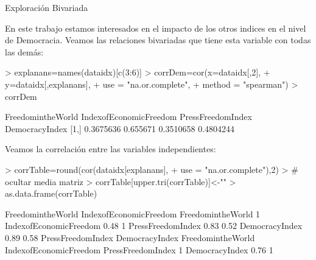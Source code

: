 \documentclass{article}
\begin{document}
Exploración Bivariada

En este trabajo estamos interesados en el impacto de los otros indices en el nivel de Democracia. Veamos las relaciones bivariadas que tiene esta variable con todas las demás:
\begin{Schunk}
\begin{Sinput}
> explanans=names(dataidx)[c(3:6)]
> corrDem=cor(x=dataidx[,2],
+             y=dataidx[,explanans],
+             use = "na.or.complete",
+             method = "spearman")
> corrDem
\end{Sinput}
\begin{Soutput}
     FreedomintheWorld IndexofEconomicFreedom PressFreedomIndex DemocracyIndex
[1,]         0.3675636               0.655671         0.3510658      0.4804244
\end{Soutput}
\end{Schunk}




Veamos la correlación entre las variables independientes:

\begin{Schunk}
\begin{Sinput}
> corrTable=round(cor(dataidx[explanans],
+                use = "na.or.complete"),2)
> # ocultar media matriz
> corrTable[upper.tri(corrTable)]<-""
> as.data.frame(corrTable)
\end{Sinput}
\begin{Soutput}
                       FreedomintheWorld IndexofEconomicFreedom
FreedomintheWorld                      1                       
IndexofEconomicFreedom              0.48                      1
PressFreedomIndex                   0.83                   0.52
DemocracyIndex                      0.89                   0.58
                       PressFreedomIndex DemocracyIndex
FreedomintheWorld                                      
IndexofEconomicFreedom                                 
PressFreedomIndex                      1               
DemocracyIndex                      0.76              1
\end{Soutput}
\end{Schunk}
\end{document}

